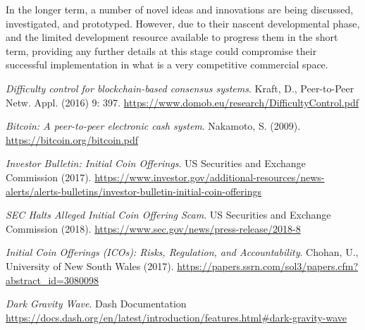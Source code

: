 \documentclass{IOS-Book-Article}
\begin{document}
In the longer term, a number of novel ideas and innovations are being discussed, investigated, and prototyped. However, due to their nascent developmental phase, and the limited development resource available to progress them in the short term, providing any further details at this stage could compromise their successful implementation in what is a very competitive commercial space.

\begin{thebibliography}{99}

\textit{Difficulty control for blockchain-based consensus systems}. Kraft, D., Peer-to-Peer Netw. Appl. (2016) 9: 397. \url{https://www.domob.eu/research/DifficultyControl.pdf}

\textit{Bitcoin: A peer-to-peer electronic cash system}. Nakamoto, S. (2009). \url{https://bitcoin.org/bitcoin.pdf}

\textit{Investor Bulletin: Initial Coin Offerings}. US Securities and Exchange Commission (2017). \url{https://www.investor.gov/additional-resources/news-alerts/alerts-bulletins/investor-bulletin-initial-coin-offerings}

\textit{SEC Halts Alleged Initial Coin Offering Scam}. US Securities and Exchange Commission (2018). \url{https://www.sec.gov/news/press-release/2018-8}

\textit{Initial Coin Offerings (ICOs): Risks, Regulation, and Accountability}. Chohan, U., University of New South Wales (2017). \url{https://papers.ssrn.com/sol3/papers.cfm?abstract_id=3080098}

\textit{Dark Gravity Wave}. Dash Documentation \url{https://docs.dash.org/en/latest/introduction/features.html#dark-gravity-wave}

\end{thebibliography}
\end{document}
